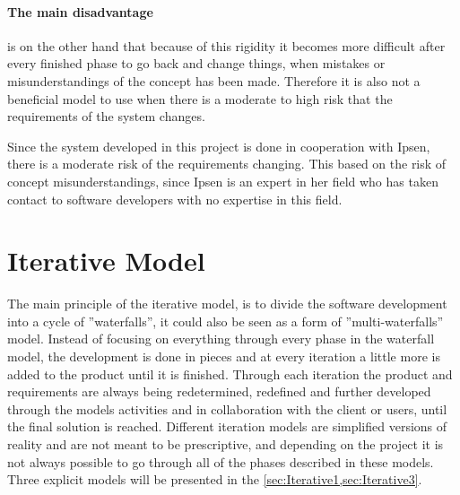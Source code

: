 \paragraph{The main disadvantage} is on the other hand that because of this rigidity it becomes more difficult after every finished phase to go back and change things, when mistakes or misunderstandings of the concept has been made.
Therefore it is also not a beneficial model to use when there is a moderate to high risk that the requirements of the system changes.

Since the system developed in this project is done in cooperation with Ipsen, there is a moderate risk of the requirements changing.
This based on the risk of concept misunderstandings, since Ipsen is an expert in her field who has taken contact to software developers with no expertise in this field.

\section{Iterative Model} \label{sec:iterativModel}
The main principle of the iterative model, \cite{Iterative-Toolsqa,InteractionDesign} is to divide the software development into a cycle of ''waterfalls'', it could also be seen as a form of ''multi-waterfalls'' model.
Instead of focusing on everything through every phase in the waterfall model, the development is done in pieces and at every iteration a little more is added to the product until it is finished.
Through each iteration the product and requirements are always being redetermined, redefined and further developed through the models activities and in collaboration with the client or users, until the final solution is reached.
Different iteration models are simplified versions of reality and are not meant to be prescriptive, and depending on the project it is not always possible to go through all of the phases described in these models. 
Three explicit models will be presented in the \cref{sec:Iterative1,sec:Iterative3}.


